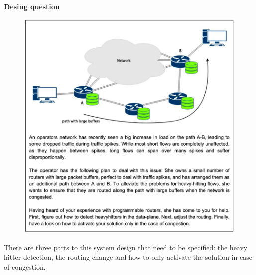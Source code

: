 \documentclass[11pt,oneside,a4paper]{article}
\begin{document}
\newpage

\noindent \textbf{Desing question}

\begin{figure}[hb]
	\centering
	\includegraphics[width=0.8\linewidth]{figures/design_question}
	\label{fig:designquestion}
\end{figure}

There are three parts to this system design that need to be specified: the heavy hitter detection, the routing change and how to only activate the solution in case of congestion.
\end{document}
